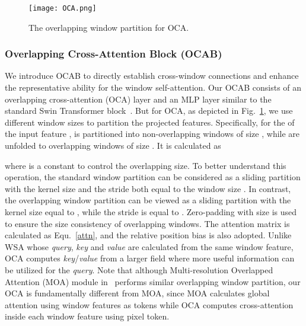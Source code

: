 \documentclass[10pt,twocolumn,letterpaper]{article}
\begin{document}
\begin{figure}[!t]
\centering
\texttt{[image: OCA.png]}
\vspace{-0.3cm}
\caption{The overlapping window partition for OCA.}
\vspace{-0.5cm}
\label{OCA}
\end{figure}

\subsubsection{Overlapping Cross-Attention Block (OCAB)}
\label{ocab}
We introduce OCAB to directly establish cross-window connections and enhance the representative ability for the window self-attention. Our OCAB consists of an overlapping cross-attention (OCA) layer and an MLP layer similar to the standard Swin Transformer block~\cite{swin_t}.  But for OCA, as depicted in Fig.~\ref{OCA}, we use different window sizes to partition the projected features. Specifically, for the  of the input feature ,  is partitioned into  non-overlapping windows of size , while  are unfolded to  overlapping windows of size . It is calculated as

where  is a constant to control the overlapping size. To better understand this operation, the standard window partition can be considered as a sliding partition with the kernel size and the stride both equal to the window size . In contrast, the overlapping window partition can be viewed as a sliding partition with the kernel size equal to , while the stride is equal to . Zero-padding with size  is used to ensure the size consistency of overlapping windows. The attention matrix is calculated as Equ.~\ref{attn}, and the relative position bias  is also adopted. Unlike WSA whose \textit{query}, \textit{key} and \textit{value} are calculated from the same window feature, OCA computes \textit{key}/\textit{value} from a larger field where more useful information can be utilized for the \textit{query}. 
Note that although Multi-resolution Overlapped Attention (MOA) module in~\cite{moa} performs similar overlapping window partition, our OCA is fundamentally different from MOA, since MOA calculates global attention using window features as tokens while OCA computes cross-attention inside each window feature using pixel token. 
\end{document}
